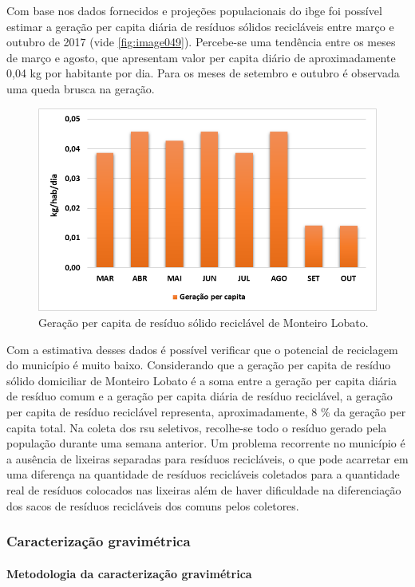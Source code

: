 	Com base nos dados fornecidos e projeções populacionais do \gls{ibge} foi possível estimar a geração per capita diária de resíduos sólidos recicláveis entre março e outubro de 2017 (vide \autoref{fig:image049}). Percebe-se uma tendência entre os meses de março e agosto, que apresentam valor per capita diário de aproximadamente 0,04 kg por habitante por dia. Para os meses de setembro e outubro é observada uma queda brusca na geração.
	
	\begin{figure}
		\centering
		\includegraphics[width=0.75\linewidth]{produtos/prodtres/image049}
		\caption{Geração per capita de resíduo sólido reciclável de Monteiro Lobato.}
		\label{fig:image049}
	\end{figure}
	
	
	Com a estimativa desses dados é possível verificar que o potencial de reciclagem do município é muito baixo. Considerando que a geração per capita de resíduo sólido domiciliar de Monteiro Lobato é a soma entre a geração per capita diária de resíduo comum e a geração per capita diária de resíduo reciclável, a geração per capita de resíduo reciclável representa, aproximadamente, 8 \% da geração per capita total.
	Na coleta dos \gls{rsu} seletivos, recolhe-se todo o resíduo gerado pela população durante uma semana anterior. Um problema recorrente no município é a ausência de lixeiras separadas para resíduos recicláveis, o que pode acarretar em uma diferença na quantidade de resíduos recicláveis coletados para a quantidade real de resíduos colocados nas lixeiras além de haver dificuldade na diferenciação dos sacos de resíduos recicláveis dos comuns pelos coletores.
	
	\subsubsection{Caracterização gravimétrica}
	
	\paragraph{\textbf{Metodologia da caracterização gravimétrica}}
	

